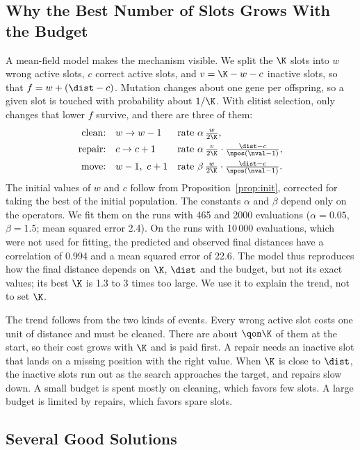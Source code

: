 \subsection{Why the Best Number of Slots Grows With the Budget}
\label{sec:theory:meanfield}

A mean-field model makes the mechanism visible.
We split the $\K$ slots into $w$ wrong active slots, $c$ correct active slots, and $v = \K - w - c$ inactive slots, so that $f = w + (\dist - c)$.
Mutation changes about one gene per offspring, so a given slot is touched with probability about $1/\K$.
With elitist selection, only changes that lower $f$ survive, and there are three of them:
\begin{align}
  \text{clean:}  &\quad w \to w-1        &&\text{rate } \alpha\, \tfrac{w}{2\K}, \\
  \text{repair:} &\quad c \to c+1        &&\text{rate } \alpha\, \tfrac{v}{2\K} \cdot \tfrac{\dist - c}{\npos(\nval-1)}, \\
  \text{move:}   &\quad w-1,\ c+1        &&\text{rate } \beta\, \tfrac{w}{2\K} \cdot \tfrac{\dist - c}{\npos(\nval-1)}.
\end{align}
The initial values of $w$ and $c$ follow from Proposition~\ref{prop:init}, corrected for taking the best of the initial population.
The constants $\alpha$ and $\beta$ depend only on the operators.
We fit them on the runs with 465 and 2000 evaluations ($\alpha = 0.05$, $\beta = 1.5$; mean squared error 2.4).
On the runs with 10\,000 evaluations, which were not used for fitting, the predicted and observed final distances have a correlation of 0.994 and a mean squared error of 22.6.
The model thus reproduces how the final distance depends on $\K$, $\dist$ and the budget, but not its exact values;
its best $\K$ is 1.3 to 3 times too large.
We use it to explain the trend, not to set $\K$.

The trend follows from the two kinds of events.
Every wrong active slot costs one unit of distance and must be cleaned.
There are about $\qon\K$ of them at the start, so their cost grows with $\K$ and is paid first.
A repair needs an inactive slot that lands on a missing position with the right value.
When $\K$ is close to $\dist$, the inactive slots run out as the search approaches the target, and repairs slow down.
A small budget is spent mostly on cleaning, which favors few slots.
A large budget is limited by repairs, which favors spare slots.

\subsection{Several Good Solutions}
\label{sec:theory:multi}

